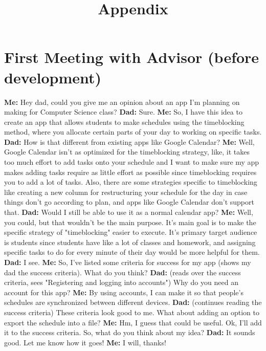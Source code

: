 \documentclass[12pt]{report}
\title{Appendix}
\begin{document}
\centerline{\textcolor{msblue}{
		\textbf{\fontsize{13}{13}\MyTitle}
	}}


\bgroup\obeylines

\section*{First Meeting with Advisor (before development)}
\textbf{Me:} Hey dad, could you give me an opinion about an app I'm planning on making for Computer Science class?
\textbf{Dad:} Sure.
\textbf{Me:} So, I have this idea to create an app that allows students to make schedules using the timeblocking method, where you allocate certain parts of your day to working on specific tasks.
\textbf{Dad:} How is that different from existing apps like Google Calendar?
\textbf{Me:} Well, Google Calendar isn't as optimized for the timeblocking strategy, like, it takes too much effort to add tasks onto your schedule and I want to make sure my app makes adding tasks require as little effort as possible since timeblocking requires you to add a lot of tasks. Also, there are some strategies specific to timeblocking like creating a new column for restructuring your schedule for the day in case things don't go according to plan, and apps like Google Calendar don't support that.
\textbf{Dad:} Would I still be able to use it as a normal calendar app?
\textbf{Me:} Well, you could, but that wouldn't be the main purpose. It's main goal is to make the specific strategy of "timeblocking" easier to execute. It's primary target audience is students since students have like a lot of classes and homework, and assigning specific tasks to do for every minute of their day would be more helpful for them.
\textbf{Dad:} I see.
\textbf{Me:} So, I've listed some criteria for success for my app (shows my dad the success criteria). What do you think?
\textbf{Dad:} (reads over the success criteria, sees "Registering and logging into accounts") Why do you need an account for this app?
\textbf{Me:} By using accounts, I can make it so that people's schedules are synchronized between different devices.
\textbf{Dad:} (continues reading the success criteria) These criteria look good to me. What about adding an option to export the schedule into a file?
\textbf{Me:} Hm, I guess that could be useful. Ok, I'll add it to the success criteria. So, what do you think about my idea?
\textbf{Dad:} It sounds good. Let me know how it goes!
\textbf{Me:} I will, thanks!
\end{document}
